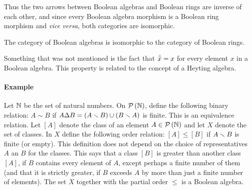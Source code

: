 Thus the two arrows between Boolean algebras and Boolean rings are
inverse of each other, and since every Boolean algebra morphism is a
Boolean ring morphism and \textit{vice versa}, both categories are isomorphic.

\begin{thmBoolAlgIsoBoolRng}\label{thm:boolalgisoboolrng}
	The category of Boolean algebras is isomorphic to the category
	of Boolean rings.
\end{thmBoolAlgIsoBoolRng}

Something that was not mentioned is the fact that $\bar{\bar{x}}=x$
for every element $x$ in a Boolean algebra. This property is related to
the concept of a Heyting algebra.

\paragraph{Example}
Let $\mathbb{N}$ be the set of natural numbers. On $\mathcal{P}\left(\mathbb{N}\right)$, define
the following binary relation: $A\sim B$ if
$A\Delta B=(A\smallsetminus B)\cup(B\smallsetminus A)$ is finite. This is an equivalence
relation. Let $[A]$ denote the class of an element $A\in\mathcal{P}\left(\mathbb{N}\right)$
and let $X$ denote the set of classes. In $X$ define the following order
relation: $[A]\leq[B]$ if $A\smallsetminus B$ is finite (or empty). This definition
does not depend on the choice of representatives $A$ an $B$ for the classes.
This says that a class $[B]$ is greater than another class $[A]$, if $B$
contains every element of $A$, except perhaps a finite number of them
(and that it is strictly greater, if $B$ exceeds $A$ by more than just a
finite number of elements). The set $X$ together with the partial order
$\leq$ is a Boolean algebra.


